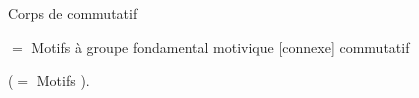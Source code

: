 Corps de  commutatif

$=$ Motifs à groupe fondamental motivique [connexe] commutatif

($=$ Motifs ).
